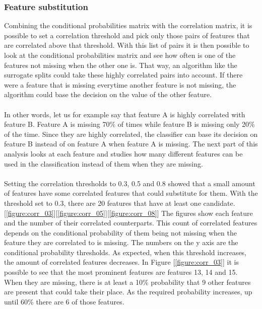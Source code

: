 \documentclass[11pt]{article}
\begin{document}
      \subsubsection{Feature substitution}
        \noindent Combining the conditional probabilities matrix with the correlation matrix, it is possible to set a correlation threshold and pick only those pairs of features that are correlated above that threshold. With this list of pairs it is then possible to look at the conditional probabilities matrix and see how often is one of the features not missing when the other one is. That way, an algorithm like the surrogate splits \cite{splits} could take these highly correlated pairs into account. If there were a feature that is missing everytime another feature is not missing, the algorithm could base the decision on the value of the other feature.
        \\~\\
        \noindent In other words, let us for example say that feature A is highly correlated with feature B. Feature A is missing 70\% of times while feature B is missing only 20\% of the time. Since they are highly correlated, the classifier can base its decision on feature B instead of on feature A when feature A is missing. The next part of this analysis looks at each feature and studies how many different features can be used in the classification instead of them when they are missing.
        \\~\\
        \noindent Setting the correlation thresholds to 0.3, 0.5 and 0.8 showed that a small amount of features have some correlated features that could substitute for them. With the threshold set to 0.3, there are 20 features that have at least one candidate. [\ref{figure:corr_03}][\ref{figure:corr_05}][\ref{figure:corr_08}] The figures show each feature and the number of their correlated counterparts. This count of correlated features depends on the conditional probability of them being not missing when the feature they are correlated to is missing. The numbers on the y axis are the conditional probability thresholds. As expected, when this threshold increases, the amount of correlated features decreases.
        \newpage
        \noindent In Figure [\ref{figure:corr_03}] it is possible to see that the most prominent features are features 13, 14 and 15. When they are missing, there is at least a 10\% probability that 9 other features are present that could take their place. As the required probability increases, up until 60\% there are 6 of those features.
\end{document}
